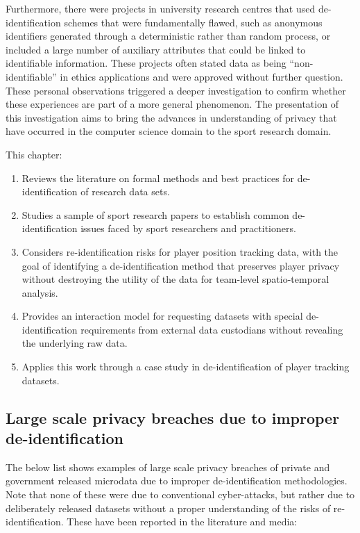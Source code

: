 Furthermore, there were projects in university research centres that used de-identification schemes that were fundamentally flawed, such as anonymous identifiers generated through a deterministic rather than random process, or included a large number of auxiliary attributes that could be linked to identifiable information. These projects often stated data as being ``non-identifiable'' in ethics applications and were approved without further question. These personal observations triggered a deeper investigation to confirm whether these experiences are part of a more general phenomenon. %
The presentation of this investigation aims to bring the advances in understanding of privacy that have occurred in the computer science domain to the sport research domain.

This chapter:
\begin{enumerate}
  \item Reviews the literature on formal methods and best practices for de-identification of research data sets.
  \item Studies a sample of sport research papers to establish common de-identification issues faced by sport researchers and practitioners.
  \item Considers re-identification risks for player position tracking data, with the goal of identifying a de-identification method that preserves player privacy without destroying the utility of the data for team-level spatio-temporal analysis.
  \item Provides an interaction model for requesting datasets with special de-identification requirements from external data custodians without revealing the underlying raw data.
  \item Applies this work through a case study in de-identification of \afl{} player tracking datasets.
\end{enumerate}


\subsection{Large scale privacy breaches due to improper de-identification}

The below list shows examples of large scale privacy breaches of private and government released microdata due to improper de-identification methodologies. Note that none of these were due to conventional cyber-attacks, but rather due to deliberately released datasets without a proper understanding of the risks of re-identification. These have been reported in the literature \cite{Ohm2010, ElEmam2011} and media:

